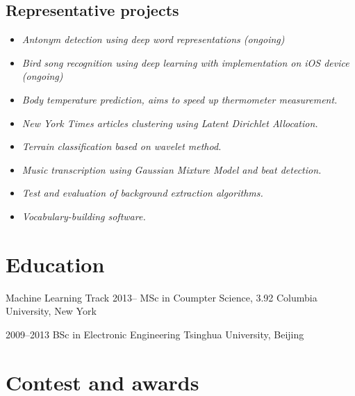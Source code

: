 \documentclass{tccv}
\begin{document}
\vspace{-10pt}

\subsection{Representative projects}

\begin{itemize}
\itemsep0em
\item {\it
Antonym detection using deep word representations (ongoing)}
\item {\it
Bird song recognition using deep learning with implementation on iOS device (ongoing)}
\item {\it
Body temperature prediction, aims to speed up thermometer measurement.}
\item {\it
New York Times articles clustering using Latent Dirichlet Allocation.}
\item {\it
Terrain classification based on wavelet method.}
\item {\it
Music transcription using Gaussian Mixture Model and beat detection.}
\item {\it
Test and evaluation of background extraction algorithms.}
\item {\it
Vocabulary-building software.}
\end{itemize}

\vfill

\section{Education}

\begin{yearlist}
\item[Machine Learning Track]{2013--}
     {MSc in Coumpter Science, 3.92}
     {Columbia University, New York}{}{}

\item[]{2009--2013}
     {BSc in Electronic Engineering}
     {Tsinghua University, Beijing}{}{}


\end{yearlist}

\section{Contest and awards}
\end{document}
